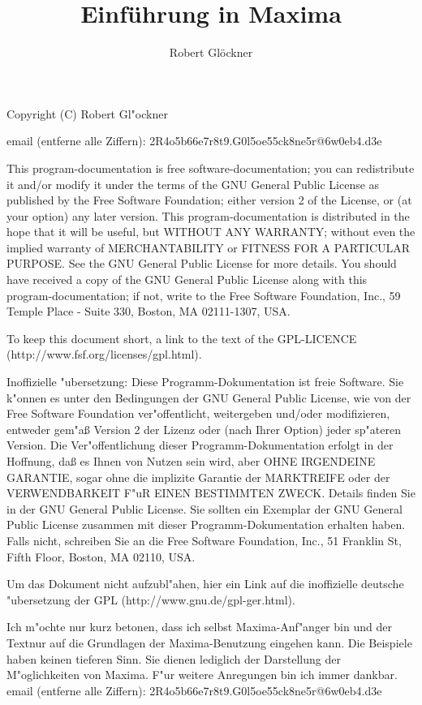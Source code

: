 \documentclass[spanish,12pt,a4paper]{article}
\title{\textbf{\Huge{Einf\"{u}hrung in Maxima}}}
\author{Robert Gl\"{o}ckner}
\begin{document}
\maketitle
\tableofcontents

Copyright (C) Robert Gl"ockner

email (entferne alle Ziffern): 2R4o5b66e7r8t9.G0l5oe55ck8ne5r@6w0eb4.d3e

\scriptsize
This program-documentation is free software-documentation; you can redistribute it and/or modify it under the terms of the GNU General Public License as published by the Free Software Foundation; either version 2 of the License, or (at your option) any later version.
This program-documentation is distributed in the hope that it will be useful, but WITHOUT ANY WARRANTY; without even the implied warranty of MERCHANTABILITY or FITNESS FOR A PARTICULAR PURPOSE. See the GNU General Public License for more details.
You should have received a copy of the GNU General Public License along with this program-documentation; if not, write to the Free Software Foundation, Inc., 59 Temple Place - Suite 330, Boston, MA 02111-1307, USA.

To keep this document short, a link to the text of the GPL-LICENCE (http://www.fsf.org/licenses/gpl.html).

Inoffizielle "ubersetzung: Diese Programm-Dokumentation ist freie Software. Sie k"onnen es unter den Bedingungen der GNU General Public License, wie von der Free Software Foundation ver"offentlicht, weitergeben und/oder modifizieren, entweder gem"aß Version 2 der Lizenz oder (nach Ihrer Option) jeder sp"ateren Version.
Die Ver"offentlichung dieser Programm-Dokumentation erfolgt in der Hoffnung, daß es Ihnen von Nutzen sein wird, aber OHNE IRGENDEINE GARANTIE, sogar ohne die implizite Garantie der MARKTREIFE oder der VERWENDBARKEIT F"uR EINEN BESTIMMTEN ZWECK. Details finden Sie in der GNU General Public License.
Sie sollten ein Exemplar der GNU General Public License zusammen mit dieser Programm-Dokumentation erhalten haben. Falls nicht, schreiben Sie an die Free Software Foundation, Inc., 51 Franklin St, Fifth Floor, Boston, MA 02110, USA.

Um das Dokument nicht aufzubl"ahen, hier ein Link auf die inoffizielle deutsche "ubersetzung der GPL (http://www.gnu.de/gpl-ger.html).
\normalsize

Ich m"ochte nur kurz betonen, dass ich selbst Maxima-Anf"anger bin und der Textnur auf die Grundlagen der Maxima-Benutzung eingehen kann. Die Beispiele haben keinen tieferen Sinn. Sie dienen lediglich der Darstellung der M"oglichkeiten von Maxima.
F"ur weitere Anregungen bin ich immer dankbar.
email (entferne alle Ziffern): 2R4o5b66e7r8t9.G0l5oe55ck8ne5r@6w0eb4.d3e
\end{document}
